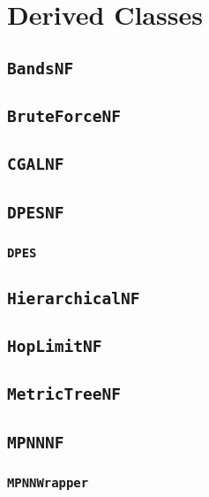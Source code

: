 \section{Derived Classes}

\subsection{\texttt{BandsNF}}

\subsection{\texttt{BruteForceNF}}

\subsection{\texttt{CGALNF}}

\subsection{\texttt{DPESNF}}

\subsubsection{\texttt{DPES}}

\subsection{\texttt{HierarchicalNF}}

\subsection{\texttt{HopLimitNF}}

\subsection{\texttt{MetricTreeNF}}

\subsection{\texttt{MPNNNF}}

\subsubsection{\texttt{MPNNWrapper}}

